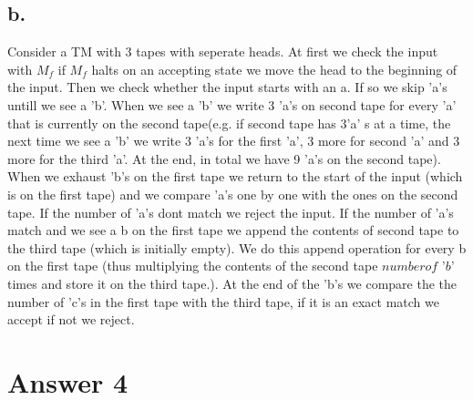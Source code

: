 \documentclass[12pt]{article}
\begin{document}
{{\subsection*{b.}
Consider a TM with 3 tapes with seperate heads. At first we check the input with $M_f$ if $M_f$ halts on an accepting state we move the head to the beginning of the input. Then we check whether the input starts with an a. If so we skip 'a's untill we see a 'b'. When we see a 'b' we write 3 'a's on second tape for every 'a' that is currently on the second tape(e.g. if second tape has 3'a' s at a time, the next time we see a 'b' we write 3 'a's for the first 'a', 3 more for second 'a' and 3 more for the third 'a'. At the end, in total we have 9 'a's on the second tape). When we exhaust 'b's  on the first tape we return to the start of the input (which is on the first tape) and we compare 'a's one by one with the ones on the second tape. If the number of 'a's dont match we reject the input. If the number of 'a's match and we see a b on the first tape we append the contents of second tape to the third tape (which is initially empty). We do this append operation for every b on the first tape (thus multiplying the contents of the second tape $\textit{numberof 'b'}$ times and store it on the third tape.). At the end of the 'b's we compare the the number of 'c's in the first tape with the third tape, if it is an exact match we accept if not we reject.

\section*{Answer 4}

}}
\end{document}
